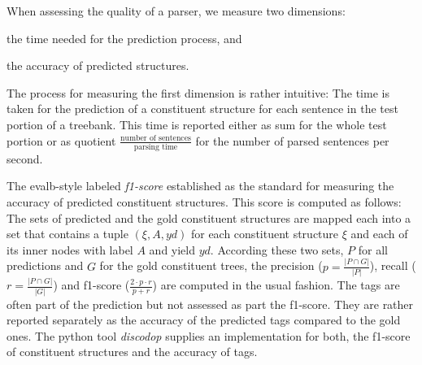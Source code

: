 \documentclass[../document.tex]{subfiles}
\begin{document}
    When assessing the quality of a parser, we measure two dimensions:
    \begin{inparaenum}[(i)]
        \item the time needed for the prediction process, and
        \item the accuracy of predicted structures.
    \end{inparaenum}
    The process for measuring the first dimension is rather intuitive:
        The time is taken for the prediction of a constituent structure for each sentence in the test portion of a treebank.
    This time is reported either as sum for the whole test portion or as quotient \(\frac{\text{number of sentences}}{\text{parsing time}}\) for the number of parsed sentences per second.

    The evalb-style labeled \emph{f1-score} \citep{Black91,Col97} established as the standard for measuring the accuracy of predicted constituent structures.
    This score is computed as follows:
        The sets of predicted and the gold constituent structures are mapped each into a set that contains a tuple \((\xi, A, \mathit{yd})\) for each constituent structure \(\xi\) and each of its inner nodes with label \(A\) and yield \(\mathit{yd}\).
        According these two sets, \(P\) for all predictions and \(G\) for the gold constituent trees, the precision (\(p = \frac{|P \cap G|}{|P|}\)), recall (\(r = \frac{|P \cap G|}{|G|}\)) and f1-score (\(\frac{2\cdot p\cdot r}{p + r}\)) are computed in the usual fashion.
    The  tags are often part of the prediction but not assessed as part the f1-score.
    They are rather reported separately as the accuracy of the predicted  tags compared to the gold ones.
    The python tool \emph{discodop} supplies an implementation for both, the f1-score of constituent structures and the accuracy of  tags. \citep{CraSchBod16}
\end{document}
